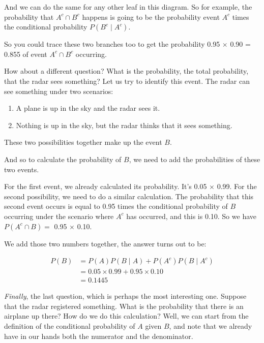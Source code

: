 \documentclass{tufte-handout}
\begin{document}
And we can do the same for any
other leaf in this diagram. So for example, the probability that $A^c \cap B^c$ happens is going to be the probability
event $A^c$ times the conditional probability $P (B^c \mid A^c)$. 

So you could trace these two branches too to get the probability 0.95 $\times$ 0.90 = 0.855 of event $A^c \cap B^c$ occurring. 

\vspace{0.2cm}
How about a different question? What is the probability, the total probability, that the radar sees
something? Let us try to identify this event. The radar can see something under two scenarios:
\begin{enumerate}
\item A plane is up in the sky and the radar sees it.
\item Nothing is up in the sky, but the radar thinks that it sees something. 
\end{enumerate}

These two possibilities together make up the event $B$.

\vspace{0.2cm}
And so to calculate the probability of $B$, we need to add the probabilities of these two events. 

For the first event, we already calculated its probability. It's 0.05 $\times$ 0.99. For the second possibility, we need to do a
similar calculation. The probability that this second event occurs is equal to 0.95 times the conditional probability of $B$
occurring under the scenario where $A^c$ has occurred, and this is 0.10. So we have $P(A^c \cap B) = $ 0.95 $\times$ 0.10. 

We add those two
numbers together, the answer turns out to be:

\begin{align*}
P (B) &= P(A) P(B \mid A) + P(A^c) P(B \mid A^c) \\
         & =  0.05 \times 0.99 + 0.95 \times 0.10\\
         &= 0.1445
\end{align*}


\vspace{0.2cm}
\textit{Finally}, the last question, which is perhaps the most interesting one. Suppose that the radar registered
something. What is the probability that there is an airplane up there? How do we do this calculation?
Well, we can start from the definition of the conditional probability of $A$ given $B$, and note that we already
have in our hands both the numerator and the denominator.
\end{document}
